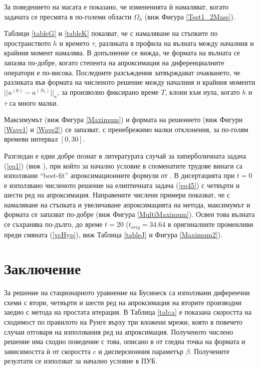 \documentclass[a4paper]{article}
\newcommand{\rf}[1]{(\ref{#1})}
\theoremstyle{remark}
\begin{document}
\begin{large}
За поведението на масата е показано, че измененията ѝ намаляват, когато задачата се пресмята в по-големи области $\Omega_h$ (виж Фигура \ref{Test1_2Mass}).

Таблици \ref{tableG} и \ref{tableK} показват, че с намаляване на стъпките по пространството $h$ и времето $\tau$, разликата в профила на вълната между началния и крайния момент намалява. 
В допълнение се вижда, че формата на вълната се запазва по-добре, когато степента на апроксимация на диференциалните оператори е по-висока. 
Последните разсъждения затвърждават очакването, че разликата във формата на численото решение между началния и крайния моменти $||u^{(0)} - u^{(N_t)}||_\kappa$, за произволно фиксирано време $T$, клони към нула, когато $h$ и $\tau$ са много малки.

Максимумът (виж Фигура \ref{Maximum}) и формата на решението (виж Фигури \ref{Wave1} и \ref{Wave2}) се запазват, с пренебрежимо малки отклонения, за по-голям времеви интервал $[0, 30]$. 

Разгледан е един добре познат в литературата случай за хиперболичната задача \rf{eq1} (виж \cite{ref21, ref20, ref23, ref22} ), 
при който за начално условие в споменатите трудове винаги са използвани ``best-fit'' апроксимационните формули от \cite{ref15}. 
В дисертацията при $t=0$ е използвано численото решение на елиптичната задача \rf{eq45} с четвърти и шести ред на апроксимация.
Направените числени примери показват, че с намаляване на стъпката и 
увеличаване апроксимацията на метода, максимумът и формата се запазват по-добре (виж Фигура \ref{MultiMaximum}). Освен това вълната се съхранява по-дълго, до време $t=20$ ($t_{orig}=34.64$ в оригиналните
променливи преди смяната \rf{vcHyp}, виж Таблица \ref{tableJ} и Фигура \ref{Maximum2}).

\newpage
\section{Заключение}

За решение на стационарното уравнение на Бусинеск са използвани диференчни схеми с втори, четвърти и шести ред на апроксимация на вторите производни заедно с метода на простата итерация. В Таблица \ref{tab:a} е показана скоростта на сходимост по правилото на Рунге върху три вложени мрежи, която в повечето случаи отговаря на използвания ред на апроксимация. Полученото числено решение има сходно поведение с това, описано в \cite{ref117,ref116} от гледна точка на формата и зависимостта ѝ от скоростта $c$ и дисперсионния параметър $\beta$. Получените резултати се използват за начално условие в ПУБ.


\end{large}
\end{document}
